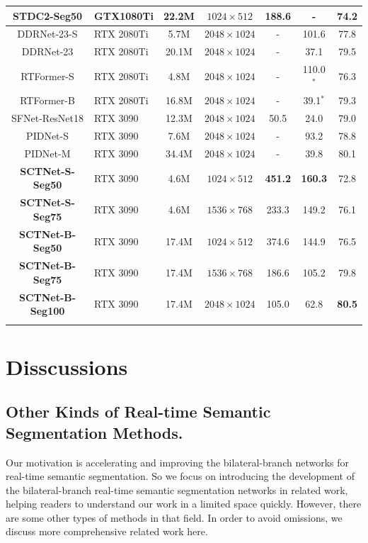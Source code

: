 \documentclass[letterpaper]{article} %
\begin{document}
\begin{table}[t]
\begin{tabular}{c|l|c|c|c|c|c}
    STDC2-Seg50 &GTX1080Ti &22.2M &$1024 \times 512$ &188.6 &-  &74.2 \\
    \hline
    DDRNet-23-S &RTX 2080Ti  &5.7M &$2048 \times 1024$ &- &101.6 &77.8 \\
    DDRNet-23 &RTX 2080Ti  &20.1M &$2048 \times 1024$ &- &37.1 &79.5 \\
    RTFormer-S &RTX 2080Ti    &4.8M &$2048 \times 1024$ &- &110.0$^*$ &76.3 \\
    RTFormer-B &RTX 2080Ti    &16.8M &$2048 \times 1024$ &- &39.1$^*$ &79.3 \\
    \hline
    SFNet-ResNet18  &RTX 3090 &12.3M  &$2048 \times 1024$ &50.5 &24.0 &79.0  \\
    PIDNet-S  &RTX 3090  &7.6M &$2048 \times 1024$ &- &93.2 &78.8 \\
    PIDNet-M  &RTX 3090  &34.4M &$2048 \times 1024$ &- &39.8 &80.1 \\
    \hline
    \textbf{SCTNet-S-Seg50}  &RTX 3090 &4.6M &$1024 \times 512$ &\textbf{451.2} &\textbf{160.3} &72.8\\
    \textbf{SCTNet-S-Seg75} &RTX 3090 &4.6M &$1536 \times 768$ &233.3 &149.2 &76.1 \\
    \textbf{SCTNet-B-Seg50}  &RTX 3090 &17.4M &$1024 \times 512$ &374.6 &144.9 &76.5 \\
    \textbf{SCTNet-B-Seg75}  &RTX 3090 &17.4M &$1536 \times 768$ &186.6 &105.2 &79.8\\
    \textbf{SCTNet-B-Seg100} &RTX 3090 &17.4M &$2048 \times 1024$ &105.0  &62.8 &\textbf{80.5} \\
    \Xhline{1pt}
  \end{tabular}
\end{table}


\section{Disscussions}\label{section:D}
\subsection{Other Kinds of Real-time Semantic Segmentation Methods.}
Our motivation is accelerating and improving the bilateral-branch networks for real-time semantic segmentation. So we focus on introducing the development of the bilateral-branch real-time semantic segmentation networks in related work, helping readers to understand our work in a limited space quickly. However, there are some other types of methods in that field. In order to avoid omissions, we discuss more comprehensive related work here.
\end{document}
